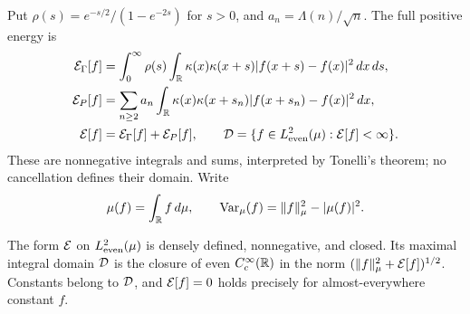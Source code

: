 Put $\rho(s)=e^{-s/2}/(1-e^{-2s})$ for $s>0$, and $a_n=\Lambda(n)/\sqrt n$. The full positive energy is
\begin{align}
 \mathcal E_\Gamma[f]&=\int_0^\infty\rho(s)\int_\mathbb R
       \kappa(x)\kappa(x+s)|f(x+s)-f(x)|^2\,dx\,ds,\label{eq:Eg}\\
 \mathcal E_P[f]&=\sum_{n\ge2}a_n\int_\mathbb R
       \kappa(x)\kappa(x+s_n)|f(x+s_n)-f(x)|^2\,dx,\label{eq:Ep}\\
 \mathcal E[f]&=\mathcal E_\Gamma[f]+\mathcal E_P[f],\qquad
 \mathcal D=\{f\in L^2_{\mathrm{even}}(\mu):\mathcal E[f]<\infty\}.\label{eq:Edomain}
\end{align}
These are nonnegative integrals and sums, interpreted by Tonelli's theorem; no cancellation defines their domain. Write
\[
 \mu(f)=\int_\mathbb R f\,d\mu,\qquad
 \operatorname{Var}_\mu(f)=\lVert f\rVert_\mu^2-|\mu(f)|^2.
\]

\begin{proposition}\label{prop:core}
The form $\mathcal E$ on $L^2_{\mathrm{even}}(\mu)$ is densely defined, nonnegative, and closed. Its maximal integral domain $\mathcal D$ is the closure of even $C_c^\infty(\mathbb R)$ in the norm $(\lVert f\rVert_\mu^2+\mathcal E[f])^{1/2}$. Constants belong to $\mathcal D$, and $\mathcal E[f]=0$ holds precisely for almost-everywhere constant $f$.
\end{proposition}
